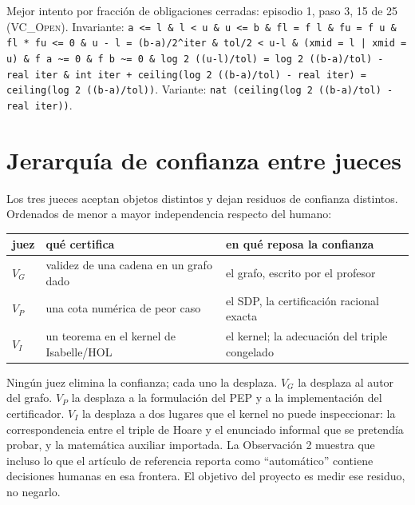 \documentclass[11pt,a4paper]{article}
\begin{document}
Mejor intento por fracción de obligaciones cerradas: episodio 1, paso 3, 15 de 25 (\textsc{VC\_Open}). Invariante: \texttt{a <=\allowbreak{} l \&\allowbreak{} l < u \&\allowbreak{} u <=\allowbreak{} b \&\allowbreak{} fl =\allowbreak{} f l \&\allowbreak{} fu =\allowbreak{} f u \&\allowbreak{} fl *\allowbreak{} fu <=\allowbreak{} 0 \&\allowbreak{} u -\allowbreak{} l =\allowbreak{} (\allowbreak{}b-\allowbreak{}a)/\allowbreak{}2\textasciicircum{}iter \&\allowbreak{} tol/\allowbreak{}2 < u-\allowbreak{}l \&\allowbreak{} (\allowbreak{}xmid =\allowbreak{} l |\allowbreak{} xmid =\allowbreak{} u) \&\allowbreak{} f a \textasciitilde{}=\allowbreak{} 0 \&\allowbreak{} f b \textasciitilde{}=\allowbreak{} 0 \&\allowbreak{} log 2 (\allowbreak{}(\allowbreak{}u-\allowbreak{}l)/\allowbreak{}tol) =\allowbreak{} log 2 (\allowbreak{}(\allowbreak{}b-\allowbreak{}a)/\allowbreak{}tol) -\allowbreak{} real iter \&\allowbreak{} int iter +\allowbreak{} ceiling(\allowbreak{}log 2 (\allowbreak{}(\allowbreak{}b-\allowbreak{}a)/\allowbreak{}tol) -\allowbreak{} real iter) =\allowbreak{} ceiling(\allowbreak{}log 2 (\allowbreak{}(\allowbreak{}b-\allowbreak{}a)/\allowbreak{}tol))}. Variante: \texttt{nat (\allowbreak{}ceiling(\allowbreak{}log 2 (\allowbreak{}(\allowbreak{}b-\allowbreak{}a)/\allowbreak{}tol) -\allowbreak{} real iter))}.

\section{Jerarquía de confianza entre jueces}

Los tres jueces aceptan objetos distintos y dejan residuos de confianza distintos. Ordenados de menor a mayor independencia respecto del humano:

\begin{center}
\begin{tabular}{@{}lll@{}}
\toprule
juez & qué certifica & en qué reposa la confianza \\
\midrule
$V_G$ & validez de una cadena en un grafo dado & el grafo, escrito por el profesor \\
$V_P$ & una cota numérica de peor caso & el SDP, la certificación racional exacta \\
$V_I$ & un teorema en el kernel de Isabelle/HOL & el kernel; la adecuación del triple congelado \\
\bottomrule
\end{tabular}
\end{center}

Ningún juez elimina la confianza; cada uno la desplaza. $V_G$ la desplaza al autor del grafo. $V_P$ la desplaza a la formulación del PEP y a la implementación del certificador. $V_I$ la desplaza a dos lugares que el kernel no puede inspeccionar: la correspondencia entre el triple de Hoare y el enunciado informal que se pretendía probar, y la matemática auxiliar importada. La Observación 2 muestra que incluso lo que el artículo de referencia reporta como ``automático'' contiene decisiones humanas en esa frontera. El objetivo del proyecto es medir ese residuo, no negarlo.
\end{document}
